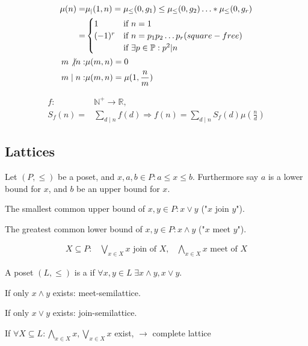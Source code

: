 \begin{align*}
  \mu(n) =& \mu_{|}(1,n) = \mu_{\leq}(0,g_1) \leq \mu_{\leq}(0,g_2) \ldots * \mu_{\leq}(0,g_r) \\
    =& \begin{cases} 
      1 & \text{if } n=1 \\
      (-1)^r & \text{if } n = p_1 p_2 \ldots p_r \text( square-free) \\
       & \text{if } \exists p\in \mathbb{P}: p^2|n
     \end{cases} \\
  m \not| n: &\mu(m,n) = 0 \\
  m \mid n:  &\mu(m,n) = \mu(1, \frac{n}{m}) \\
\end{align*}


\begin{align*}
  f: &\mathbb{N}^{+} \rightarrow \mathbb{R}, \\
  S_f(n) =& \sum_{d\mid n} f(d) \Rightarrow f(n) = \sum_{d\mid n} S_f(d)\mu\left(\frac{n}{d}\right)
\end{align*}

\subsection{Lattices}
\begin{definition}
Let $(P, \leq)$ be a poset, and $x,a,b \in P: a\leq x \leq b$. Furthermore say $a$ is a lower bound for $x$, and $b$ be an upper bound for $x$.

The smallest common upper bound of $x,y \in P: x \vee y$ ("$x$ join $y$").

The greatest common lower bound of $x,y \in P: x \wedge y$ ("$x$ meet $y$").

\begin{align*}
    X \subseteq P: &\bigvee_{x \in X} x \text{ join of } X, 
        & \bigwedge_{x \in X} x \text{ meet of } X 
\end{align*}
\end{definition}

\begin{definition}
A poset $(L, \leq)$ is a  if $\forall x,y \in L \; \exists x \wedge y, x \vee y$.

If only $x \wedge y$ exists: meet-semilattice. 

If only $x \vee y$ exists: join-semilattice. 


If $\forall X \subseteq L : \bigwedge_{x \in X} x, \bigvee_{x \in X} x$ exist, $\rightarrow$ complete lattice
\end{definition}

